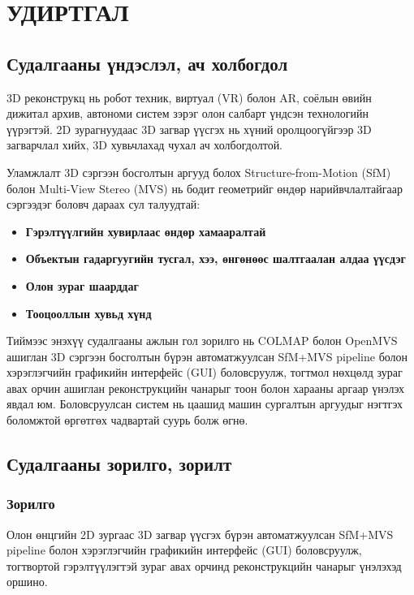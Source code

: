 \chapter{УДИРТГАЛ}

\section{Судалгааны үндэслэл, ач холбогдол}

3D реконструкц нь робот техник, виртуал (VR) болон AR, соёлын өвийн дижитал архив, автономи систем зэрэг олон салбарт үндсэн технологийн үүрэгтэй. 2D зурагнуудаас 3D загвар үүсгэх нь хүний оролцоогүйгээр 3D загварчлал хийх, 3D хувьчлахад чухал ач холбогдолтой.

Уламжлалт 3D сэргээн босголтын аргууд болох Structure-from-Motion (SfM) болон Multi-View Stereo (MVS) нь бодит геометрийг өндөр нарийвчлалтайгаар сэргээдэг боловч дараах сул талуудтай:

\begin{itemize}
    \item \textbf{Гэрэлтүүлгийн хувирлаас өндөр хамааралтай}
    \item \textbf{Объектын гадаргуугийн тусгал, хээ, өнгөнөөс шалтгаалан алдаа үүсдэг}
    \item \textbf{Олон зураг шаарддаг}
    \item \textbf{Тооцооллын хувьд хүнд}
\end{itemize}

Тиймээс энэхүү судалгааны ажлын гол зорилго нь COLMAP болон OpenMVS ашиглан 3D
сэргээн босголтын бүрэн автоматжуулсан SfM+MVS pipeline болон хэрэглэгчийн графикийн
интерфейс (GUI) боловсруулж, тогтмол нөхцөлд зураг авах орчин ашиглан реконструкцийн
чанарыг тоон болон харааны аргаар үнэлэх явдал юм. Боловсруулсан систем нь цаашид
машин сургалтын аргуудыг нэгтгэх боломжтой өргөтгөх чадвартай суурь болж өгнө.

\section{Судалгааны зорилго, зорилт}

\subsection{Зорилго}

Олон өнцгийн 2D зургаас 3D загвар үүсгэх бүрэн автоматжуулсан SfM+MVS pipeline болон хэрэглэгчийн графикийн интерфейс (GUI) боловсруулж, тогтвортой гэрэлтүүлэгтэй зураг авах орчинд реконструкцийн чанарыг үнэлэхэд оршино.

